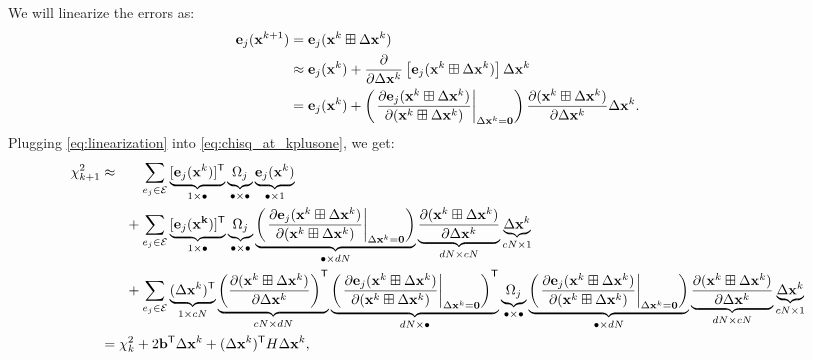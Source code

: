 \documentclass{article}
\newcommand{\transp}{{\scriptstyle{\mathsf{T}}}}
\begin{document}
%
We will linearize the errors as:
%
\begin{align}
    \mathbf{e}_j(\mathbf{x}^{k+1}) &= \mathbf{e}_j(\mathbf{x}^k \boxplus \Delta \mathbf{x}^k) \notag \\
    &\approx \mathbf{e}_j(\mathbf{x}^{k}) + \frac{\partial}{\partial \Delta \mathbf{x}^k} \left[ \mathbf{e}_j(\mathbf{x}^k \boxplus \Delta \mathbf{x}^k) \right] \Delta \mathbf{x}^k \notag \\
    &= \mathbf{e}_j(\mathbf{x}^{k}) + \left( \left. \frac{\partial \mathbf{e}_j(\mathbf{x}^k \boxplus \Delta \mathbf{x}^k)}{\partial (\mathbf{x}^k \boxplus \Delta \mathbf{x}^k)} \right|_{\Delta \mathbf{x}^k = \mathbf{0}} \right) \frac{\partial (\mathbf{x}^k \boxplus \Delta \mathbf{x}^k)}{\partial \Delta \mathbf{x}^k} \Delta \mathbf{x}^k.  \label{eq:linearization}
\end{align}
%
Plugging \eqref{eq:linearization} into \eqref{eq:chisq_at_kplusone}, we get:
%
\small
\begin{align}
    \chi_{k+1}^2 &\approx \ \ \ \ \ \sum_{e_j \in \mathcal{E}} \underbrace{[ \mathbf{e}_j(\mathbf{x}^k)]^\transp}_{1 \times \bullet} \underbrace{\Omega_j}_{\bullet \times \bullet} \underbrace{\mathbf{e}_j(\mathbf{x}^k)}_{\bullet \times 1} \notag \\
    &\hphantom{\approx} \ \ \ + \sum_{e_j \in \mathcal{E}} \underbrace{[ \mathbf{e}_j(\mathbf{x^k}) ]^\transp }_{1 \times \bullet} \underbrace{\Omega_j}_{\bullet \times \bullet} \underbrace{\left( \left. \frac{\partial \mathbf{e}_j(\mathbf{x}^k \boxplus \Delta \mathbf{x}^k)}{\partial (\mathbf{x}^k \boxplus \Delta \mathbf{x}^k)} \right|_{\Delta \mathbf{x}^k = \mathbf{0}} \right)}_{\bullet \times dN} \underbrace{\frac{\partial (\mathbf{x}^k \boxplus \Delta \mathbf{x}^k)}{\partial \Delta \mathbf{x}^k}}_{dN \times cN} \underbrace{\Delta \mathbf{x}^k}_{cN \times 1} \notag \\
    &\hphantom{\approx} \ \ \ + \sum_{e_j \in \mathcal{E}} \underbrace{(\Delta \mathbf{x}^k)^\transp}_{1 \times cN} \underbrace{ \left( \frac{\partial (\mathbf{x}^k \boxplus \Delta \mathbf{x}^k)}{\partial \Delta \mathbf{x}^k} \right)^\transp}_{cN \times dN} \underbrace{\left( \left. \frac{\partial \mathbf{e}_j(\mathbf{x}^k \boxplus \Delta \mathbf{x}^k)}{\partial (\mathbf{x}^k \boxplus \Delta \mathbf{x}^k)} \right|_{\Delta \mathbf{x}^k = \mathbf{0}} \right)^\transp}_{dN \times \bullet} \underbrace{\Omega_j}_{\bullet \times \bullet} \underbrace{\left( \left. \frac{\partial \mathbf{e}_j(\mathbf{x}^k \boxplus \Delta \mathbf{x}^k)}{\partial (\mathbf{x}^k \boxplus \Delta \mathbf{x}^k)} \right|_{\Delta \mathbf{x}^k = \mathbf{0}} \right)}_{\bullet \times dN} \underbrace{\frac{\partial (\mathbf{x}^k \boxplus \Delta \mathbf{x}^k)}{\partial \Delta \mathbf{x}^k}}_{dN \times cN} \underbrace{\Delta \mathbf{x}^k}_{cN \times 1} \notag \\
    &= \chi_k^2 + 2 \mathbf{b}^\transp \Delta \mathbf{x}^k + (\Delta \mathbf{x}^k)^\transp H \Delta \mathbf{x}^k,  \notag
\end{align}
\end{document}
